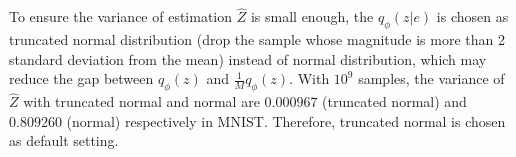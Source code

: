 To ensure the variance of estimation $\hat{Z}$ is small enough, the $q_\phi(z|e)$ is chosen as truncated normal distribution (drop the sample whose magnitude is more than 2 standard deviation from the mean) instead of normal distribution, which may reduce the gap between $q_\phi(z)$ and $\frac{1}{M}{q}_\phi(z)$. 
With $10^9$ samples, the variance of $\hat{Z}$ with truncated normal and normal are $0.000967$ (truncated normal) and $0.809260$ (normal) respectively in MNIST. Therefore, truncated normal is chosen as default setting. 


